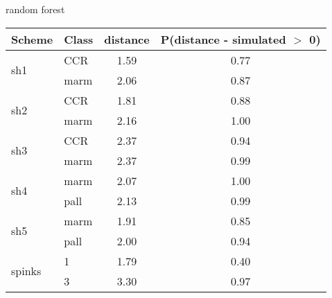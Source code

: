 \begin{subtable}[b]{0.3\textwidth}
  \caption{random forest}
  \centering
  \begin{tabular}{ l | l c c }
    \hline
    Scheme & Class & distance & P(distance - simulated \(>\) 0)\\ 
    \hline
    \hline
    \multirow{2}{*}{sh1} & CCR & 1.59 & 0.77 \\ 
    & marm & 2.06 & 0.87 \\ 
    \hline
    \multirow{2}{*}{sh2} & CCR & 1.81 & 0.88 \\ 
    & marm & 2.16 & 1.00 \\ 
    \hline
    \multirow{2}{*}{sh3} & CCR & 2.37 & 0.94 \\ 
    & marm & 2.37 & 0.99 \\ 
    \hline
    \multirow{2}{*}{sh4} & marm & 2.07 & 1.00 \\ 
    & pall & 2.13 & 0.99 \\ 
    \hline
    \multirow{2}{*}{sh5} & marm & 1.91 & 0.85 \\ 
    & pall & 2.00 & 0.94 \\ 
    \hline
    \multirow{2}{*}{spinks} & 1 & 1.79 & 0.40 \\ 
    & 3 & 3.30 & 0.97 \\ 
    \hline
  \end{tabular}
  \label{rfmiss}
\end{subtable}
